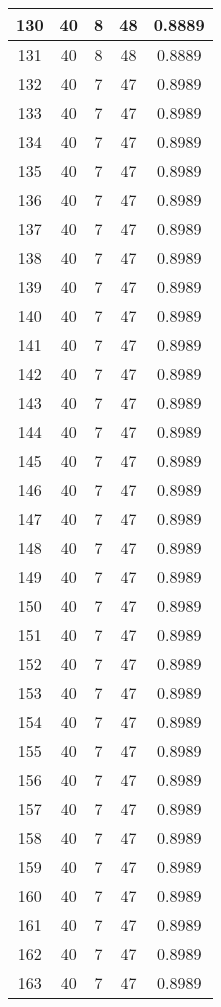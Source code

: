 \documentclass[letterpaper, 12pt]{article}
\begin{document}
\begin{longtable}{|c|c|c|c|c|}
\hline
130 & 40 & 8 & 48 & 0.8889 \\
\hline
131 & 40 & 8 & 48 & 0.8889 \\
\hline
132 & 40 & 7 & 47 & 0.8989 \\
\hline
133 & 40 & 7 & 47 & 0.8989 \\
\hline
134 & 40 & 7 & 47 & 0.8989 \\
\hline
135 & 40 & 7 & 47 & 0.8989 \\
\hline
136 & 40 & 7 & 47 & 0.8989 \\
\hline
137 & 40 & 7 & 47 & 0.8989 \\
\hline
138 & 40 & 7 & 47 & 0.8989 \\
\hline
139 & 40 & 7 & 47 & 0.8989 \\
\hline
140 & 40 & 7 & 47 & 0.8989 \\
\hline
141 & 40 & 7 & 47 & 0.8989 \\
\hline
142 & 40 & 7 & 47 & 0.8989 \\
\hline
143 & 40 & 7 & 47 & 0.8989 \\
\hline
144 & 40 & 7 & 47 & 0.8989 \\
\hline
145 & 40 & 7 & 47 & 0.8989 \\
\hline
146 & 40 & 7 & 47 & 0.8989 \\
\hline
147 & 40 & 7 & 47 & 0.8989 \\
\hline
148 & 40 & 7 & 47 & 0.8989 \\
\hline
149 & 40 & 7 & 47 & 0.8989 \\
\hline
150 & 40 & 7 & 47 & 0.8989 \\
\hline
151 & 40 & 7 & 47 & 0.8989 \\
\hline
152 & 40 & 7 & 47 & 0.8989 \\
\hline
153 & 40 & 7 & 47 & 0.8989 \\
\hline
154 & 40 & 7 & 47 & 0.8989 \\
\hline
155 & 40 & 7 & 47 & 0.8989 \\
\hline
156 & 40 & 7 & 47 & 0.8989 \\
\hline
157 & 40 & 7 & 47 & 0.8989 \\
\hline
158 & 40 & 7 & 47 & 0.8989 \\
\hline
159 & 40 & 7 & 47 & 0.8989 \\
\hline
160 & 40 & 7 & 47 & 0.8989 \\
\hline
161 & 40 & 7 & 47 & 0.8989 \\
\hline
162 & 40 & 7 & 47 & 0.8989 \\
\hline
163 & 40 & 7 & 47 & 0.8989 \\

\end{longtable}
\end{document}

